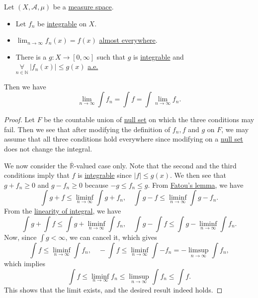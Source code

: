 \begin{theorem}\label{thm:DCT}
	Let \((X, \mathcal{A} , \mu )\) be a \hyperref[def:measure-space]{measure space}.
	\begin{itemize}
		\item Let \(f_{n}\) be \hyperref[def:integrable]{integrable} on \(X\).
		\item \(\lim_{n \to \infty} f_{n}(x) = f(x)\) \hyperref[def:mu-almost-everywhere]{almost everywhere}.
		\item There is a \(g\colon X\to [0, \infty ]\) such that \(g\) is \hyperref[def:integrable]{integrable} and \(\underset{n\in\mathbb{N} }{\forall }\ \left\vert f_{n}(x) \right\vert \leq g(x)\) \hyperref[def:mu-almost-everywhere]{a.e.}
	\end{itemize}
	Then we have
	\[
		\lim_{n \to \infty} \int f_{n} = \int f = \int \lim_{n \to \infty} f_{n}.
	\]
\end{theorem}
\begin{proof}
	Let \(F\) be the countable union of \hyperref[def:mu-null-set]{null set} on which the three conditions may fail. Then we see that after modifying the definition of \(f_{n}, f\) and \(g\) on \(F\), we may assume that all three conditions hold everywhere since modifying on a \hyperref[def:mu-null-set]{null set} does not change the integral.

	We now consider the \(\overline{\mathbb{R} }\)-valued case only. Note that the second and the third conditions imply that \(f\) is \hyperref[def:integrable]{integrable} since \(\left\vert f \right\vert \leq g(x)\). We then see that \(g + f_{n}\geq 0\) and \(g - f_{n}\geq 0\) because \(-g\leq f_{n}\leq g\). From \hyperref[thm:Fatou-lemma]{Fatou's lemma}, we have
	\[
		\int g + f \leq \liminf_{n \to \infty} \int g + f_{n},\quad \int g - f\leq \liminf_{n \to \infty} \int g - f_{n}.
	\]
	From the \hyperref[lma:linearity-of-integral]{linearity of integral}, we have
	\[
		\int g + \int f\leq \int g + \liminf_{n \to \infty} \int f_{n},\quad \int g - \int f \leq \int g - \liminf_{n \to \infty} \int f_{n}.
	\]
	Now, since \(\int g<\infty \), we can cancel it, which gives
	\[
		\int f \leq \liminf_{n \to \infty} \int f_{n},\quad -\int f \leq \liminf_{n \to \infty} \int -f_{n} = - \limsup_{n \to \infty} \int f_{n},
	\]
	which implies
	\[
		\int f \leq \liminf_{n \to \infty} f_{n}\leq \limsup_{n \to \infty} \int f_{n}\leq \int f.
	\]
	This shows that the limit exists, and the desired result indeed holds.
\end{proof}

